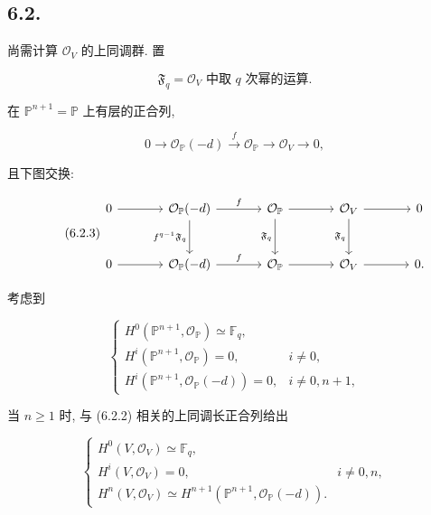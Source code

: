 \subsection*{6.2.}
尚需计算 $\mathcal O_V$ 的上同调群. 置

\begin{equation}\tag{6.2.1}
\mathfrak F_q
=\text{$\mathcal O_V$ 中取 $q$ 次幂的运算}.
\end{equation}

在 $\mathbb P^{n+1}=\mathbb P$ 上有层的正合列,

\begin{equation}\tag{6.2.2}
0\longrightarrow\mathcal O_{\mathbb P}(-d)
\xrightarrow{\,f\,}\mathcal O_{\mathbb P}
\longrightarrow\mathcal O_V\longrightarrow0,
\end{equation}

且下图交换:

\begin{equation}\tag{6.2.3}
\begin{tikzcd}[column sep=large,row sep=large]
0 \arrow[r] &
\mathcal O_{\mathbb P}(-d) \arrow[r,"f"] \arrow[d,"f^{q-1}\mathfrak F_q"'] &
\mathcal O_{\mathbb P} \arrow[r] \arrow[d,"\mathfrak F_q"'] &
\mathcal O_V \arrow[r] \arrow[d,"\mathfrak F_q"'] &
0\\
0 \arrow[r] &
\mathcal O_{\mathbb P}(-d) \arrow[r,"f"] &
\mathcal O_{\mathbb P} \arrow[r] &
\mathcal O_V \arrow[r] &
0 .
\end{tikzcd}
\end{equation}

考虑到

\begin{equation}\tag{6.2.4}
\begin{cases}
H^0(\mathbb P^{n+1},\mathcal O_{\mathbb P})\simeq\mathbb F_q,\\
H^i(\mathbb P^{n+1},\mathcal O_{\mathbb P})=0,
&i\ne0,\\
H^i(\mathbb P^{n+1},\mathcal O_{\mathbb P}(-d))=0,
&i\ne0,n+1,
\end{cases}
\end{equation}

当 $n\geq1$ 时, 与 (6.2.2) 相关的上同调长正合列给出

\begin{equation}\tag{6.2.5}
\begin{cases}
H^0(V,\mathcal O_V)\simeq\mathbb F_q,\\
H^i(V,\mathcal O_V)=0,&i\ne0,n,\\
H^n(V,\mathcal O_V)
\simeq H^{n+1}(\mathbb P^{n+1},\mathcal O_{\mathbb P}(-d)).
\end{cases}
\end{equation}

